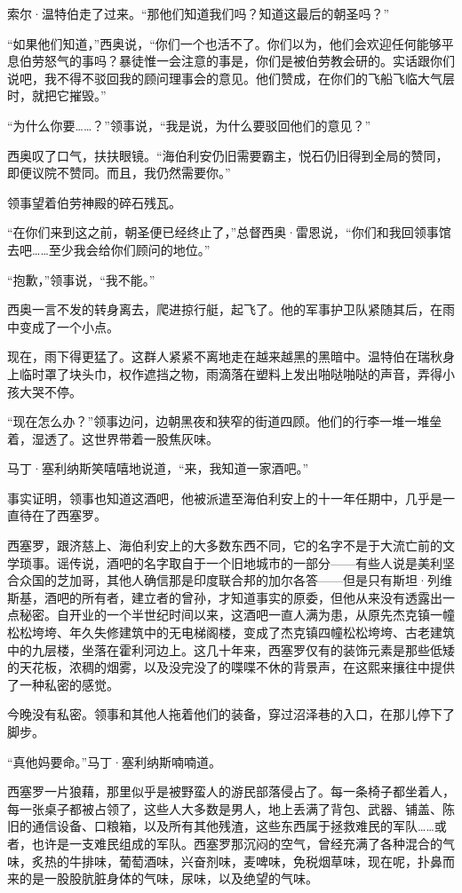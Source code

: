 \documentclass[AutoFakeBold=true]{book}
\begin{document}
索尔·温特伯走了过来。``那他们知道我们吗？知道这最后的朝圣吗？''

``如果他们知道，''西奥说，``你们一个也活不了。你们以为，他们会欢迎任何能够平息伯劳怒气的事吗？暴徒惟一会注意的事是，你们是被伯劳教会研的。实话跟你们说吧，我不得不驳回我的顾问理事会的意见。他们赞成，在你们的飞船飞临大气层时，就把它摧毁。''

``为什么你要……？''领事说，``我是说，为什么要驳回他们的意见？''

西奥叹了口气，扶扶眼镜。``海伯利安仍旧需要霸主，悦石仍旧得到全局的赞同，即便议院不赞同。而且，我仍然需要你。''

领事望着伯劳神殿的碎石残瓦。

``在你们来到这之前，朝圣便已经终止了，''总督西奥·雷恩说，``你们和我回领事馆去吧……至少我会给你们顾问的地位。''

``抱歉，''领事说，``我不能。''

西奥一言不发的转身离去，爬进掠行艇，起飞了。他的军事护卫队紧随其后，在雨中变成了一个小点。

现在，雨下得更猛了。这群人紧紧不离地走在越来越黑的黑暗中。温特伯在瑞秋身上临时罩了块头巾，权作遮挡之物，雨滴落在塑料上发出啪哒啪哒的声音，弄得小孩大哭不停。

``现在怎么办？''领事边问，边朝黑夜和狭窄的街道四顾。他们的行李一堆一堆垒着，湿透了。这世界带着一股焦灰味。

马丁·塞利纳斯笑嘻嘻地说道，``来，我知道一家酒吧。''

\vspace*{1em}

事实证明，领事也知道这酒吧，他被派遣至海伯利安上的十一年任期中，几乎是一直待在了西塞罗。

西塞罗，跟济慈上、海伯利安上的大多数东西不同，它的名字不是于大流亡前的文学琐事。谣传说，酒吧的名字取自于一个旧地城市的一部分——有些人说是美利坚合众国的芝加哥，其他人确信那是印度联合邦的加尔各答——但是只有斯坦·列维斯基，酒吧的所有者，建立者的曾孙，才知道事实的原委，但他从来没有透露出一点秘密。自开业的一个半世纪时间以来，这酒吧一直人满为患，从原先杰克镇一幢松松垮垮、年久失修建筑中的无电梯阁楼，变成了杰克镇四幢松松垮垮、古老建筑中的九层楼，坐落在霍利河边上。这几十年来，西塞罗仅有的装饰元素是那些低矮的天花板，浓稠的烟雾，以及没完没了的喋喋不休的背景声，在这熙来攘往中提供了一种私密的感觉。

今晚没有私密。领事和其他人拖着他们的装备，穿过沼泽巷的入口，在那儿停下了脚步。

``真他妈要命。''马丁·塞利纳斯喃喃道。

西塞罗一片狼藉，那里似乎是被野蛮人的游民部落侵占了。每一条椅子都坐着人，每一张桌子都被占领了，这些人大多数是男人，地上丢满了背包、武器、铺盖、陈旧的通信设备、口粮箱，以及所有其他残渣，这些东西属于拯救难民的军队……或者，也许是一支难民组成的军队。西塞罗那沉闷的空气，曾经充满了各种混合的气味，炙热的牛排味，葡萄酒味，兴奋剂味，麦啤味，免税烟草味，现在呢，扑鼻而来的是一股股肮脏身体的气味，尿味，以及绝望的气味。
\end{document}
